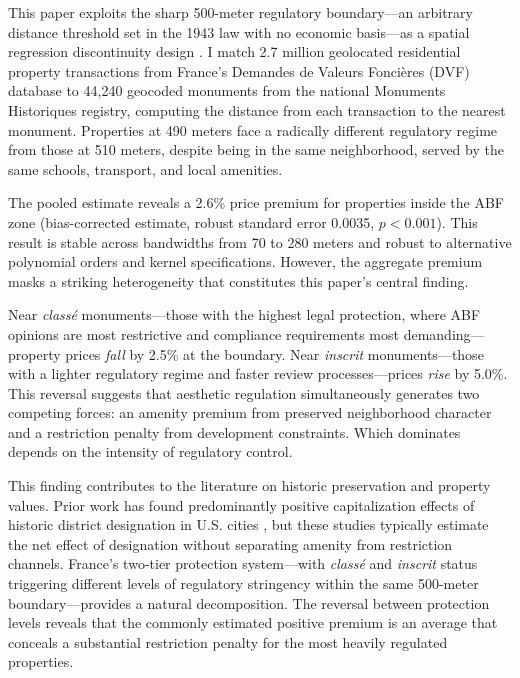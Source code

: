 \documentclass[12pt]{article}
\begin{document}
This paper exploits the sharp 500-meter regulatory boundary---an arbitrary distance threshold set in the 1943 law with no economic basis---as a spatial regression discontinuity design \citep{KeeleTitiunik2015}. I match 2.7 million geolocated residential property transactions from France's Demandes de Valeurs Fonci\`{e}res (DVF) database to 44,240 geocoded monuments from the national Monuments Historiques registry, computing the distance from each transaction to the nearest monument. Properties at 490 meters face a radically different regulatory regime from those at 510 meters, despite being in the same neighborhood, served by the same schools, transport, and local amenities.

The pooled estimate reveals a 2.6\% price premium for properties inside the ABF zone (bias-corrected estimate, robust standard error 0.0035, $p < 0.001$). This result is stable across bandwidths from 70 to 280 meters and robust to alternative polynomial orders and kernel specifications. However, the aggregate premium masks a striking heterogeneity that constitutes this paper's central finding.

Near \textit{class\'{e}} monuments---those with the highest legal protection, where ABF opinions are most restrictive and compliance requirements most demanding---property prices \textit{fall} by 2.5\% at the boundary. Near \textit{inscrit} monuments---those with a lighter regulatory regime and faster review processes---prices \textit{rise} by 5.0\%. This reversal suggests that aesthetic regulation simultaneously generates two competing forces: an amenity premium from preserved neighborhood character and a restriction penalty from development constraints. Which dominates depends on the intensity of regulatory control.

This finding contributes to the literature on historic preservation and property values. Prior work has found predominantly positive capitalization effects of historic district designation in U.S. cities \citep{AsabereHuffman1994, Leichenko2001, Noonan2007, Ahlfeldt2011}, but these studies typically estimate the net effect of designation without separating amenity from restriction channels. France's two-tier protection system---with \textit{class\'{e}} and \textit{inscrit} status triggering different levels of regulatory stringency within the same 500-meter boundary---provides a natural decomposition. The reversal between protection levels reveals that the commonly estimated positive premium is an average that conceals a substantial restriction penalty for the most heavily regulated properties.
\end{document}
